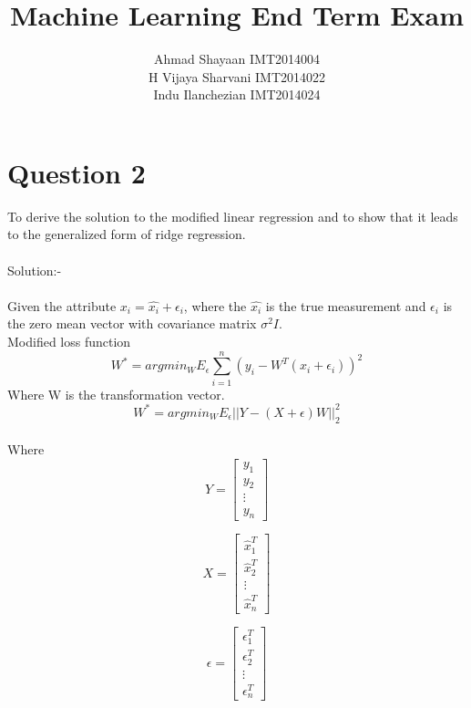 \documentclass{article}
\title{Machine Learning End Term Exam}
\author{Ahmad Shayaan IMT2014004 \\ H Vijaya Sharvani IMT2014022 \\ Indu Ilanchezian IMT2014024}
\begin{document}
\maketitle
{}

\section*{Question 2}

To derive the solution to the modified linear regression and to show that it leads to the generalized form of ridge regression.
\\
\\
Solution:-
\\
\\
Given the attribute $x_i = \hat{x_i} + \epsilon_i $, where the $\hat{x_i}$ is the true measurement and $\epsilon_i$ is the zero mean vector with covariance matrix $\sigma^2 I$.
\\
Modified loss function
\begin{equation*}
W^* = argmin_W E_\epsilon\sum_{i=1}^{n}(y_i - W^T(\hat{x_i} + \epsilon_i))^2
\end{equation*}
Where W is the transformation vector.
\begin{equation}
W^* = argmin_W E_\epsilon || Y - (X+\epsilon)W||_2^2 \tag{1}
\end{equation}
\\
Where
\begin{equation*}
	Y = \begin{bmatrix}
	y_1\\y_2\\\vdots\\y_n 
	\end{bmatrix}
\end{equation*}

\begin{equation*}
	X = \begin{bmatrix}
	\hat{x}_1^T\\\hat{x}_2^T\\\vdots\\\hat{x}_n^T
	\end{bmatrix}
\end{equation*}

\begin{equation*}
	\epsilon = \begin{bmatrix}
		\epsilon_1^T\\\epsilon_2^T\\\vdots\\\epsilon_n^T
	\end{bmatrix}
\end{equation*}
\end{document}
